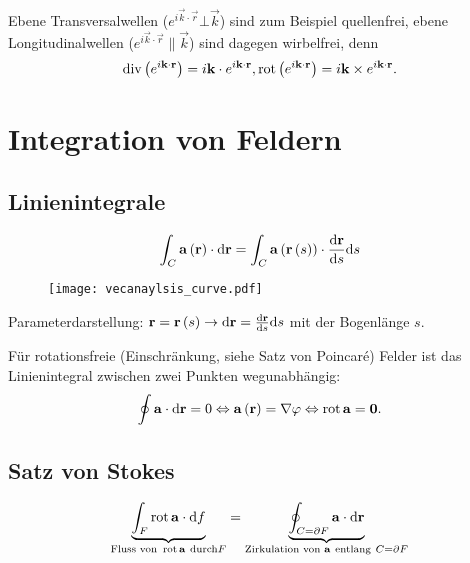 Ebene Transversalwellen ($e^{i\vec {k}\cdot \vec {r}}\bot \vec {k}$) sind zum Beispiel quellenfrei, ebene Longitudinalwellen ($e^{i\vec {k}\cdot \vec {r}}\parallel \vec {k}$) sind dagegen wirbelfrei, denn
\begin{equation*}
	\operatorname{div} \left(e^{i\mathbf{k}\cdot \mathbf{r}}\right)=i\mathbf{k}\cdot e^{i\mathbf{k}\cdot \mathbf{r}}, \operatorname{rot} \left(e^{i\mathbf{k}\cdot \mathbf{r}}\right)=i\mathbf{k}\times e^{i\mathbf{k}\cdot \mathbf{r}}.
\end{equation*}
\section{Integration von Feldern\label{ref-010}}

\subsection{Linienintegrale\label{ref-011}}


\begin{equation*}
	\int _{C}\mathbf{a}\left(\mathbf{r}\right)\cdot \text{d} \mathbf{r}=\int _{C}\mathbf{a}\left(\mathbf{r}\left(s\right)\right)\cdot \frac{\text{d} \mathbf{r}}{\text{d} s}\text{d} s
\end{equation*}


\begin{figure}[htb]
	\centering
	\texttt{[image: vecanaylsis\_curve.pdf]}
	\caption{}
	\label{fig:vecanaylsis_curve}
\end{figure}

Parameterdarstellung: $\mathbf{r}=\mathbf{r}\left(s\right)\rightarrow \text{d} \mathbf{r}=\frac{\text{d} \mathbf{r}}{\text{d} s}\text{d} s$ mit der Bogenlänge $s$.

Für rotationsfreie (Einschränkung, siehe Satz von Poincaré) Felder ist das Linienintegral zwischen zwei Punkten wegunabhängig:
\begin{equation*}
	\oint \mathbf{a}\cdot \text{d} \mathbf{r}=0\Leftrightarrow \mathbf{a}\left(\mathbf{r}\right)=\nabla \varphi \Leftrightarrow \operatorname{rot} \mathbf{a}=\mathbf{0}.
\end{equation*}
\subsection{Satz von Stokes\label{ref-012}}


\begin{equation*}
	\underset{\text{Fluss von }\operatorname{rot} \mathbf{a}~\text{durch} F}{\underbrace{ \int _{F}\operatorname{rot} \mathbf{a}\cdot \text{d} f}}=\underset{\text{Zirkulation von }\mathbf{a}~\text{entlang}~ C=\partial F}{\underbrace{\oint _{C=\partial F}\mathbf{a}\cdot \text{d} \mathbf{r}}}
\end{equation*}


